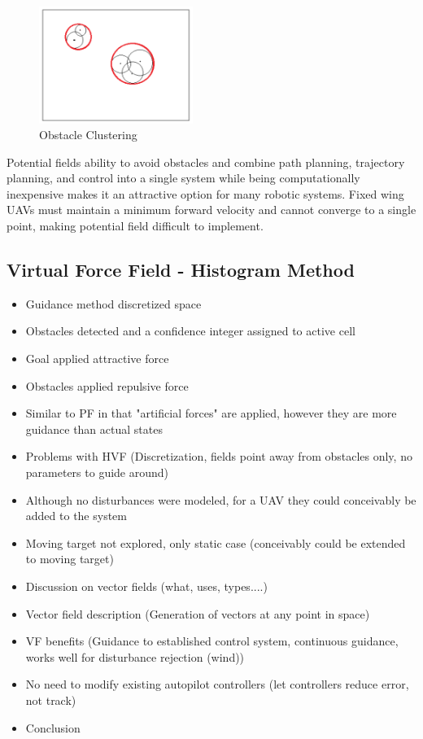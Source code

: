 \documentclass[numbered,pdftex]{ohio-etd}
\begin{document}
\begin{figure}[H]
	\centering
	\includegraphics[width=5cm]{PaperFigures/obstacleClustering}
	\caption{Obstacle Clustering \cite{liu_virtual-waypoint_2016}}
	\label{fig:obstacleclustering}
\end{figure}

Potential fields ability to avoid obstacles and combine path planning, trajectory planning, and control into a single system while being computationally inexpensive makes it an attractive option for many robotic systems. Fixed wing UAVs must maintain a minimum forward velocity and cannot converge to a single point, making potential field difficult to implement. 


\subsection{Virtual Force Field - Histogram Method}
\begin{itemize}
	\item Guidance method discretized space
	\item Obstacles detected and a confidence integer assigned to active cell
	\item Goal applied attractive force
	\item Obstacles applied repulsive force
	\item Similar to PF in that "artificial forces" are applied, however they are more guidance than actual states
	\item Problems with HVF (Discretization, fields point away from obstacles only, no parameters to guide around)
	\item Although no disturbances were modeled, for a UAV they could conceivably be added to the system
	\item Moving target not explored, only static case (conceivably could be extended to moving target)
\end{itemize}

	
\begin{itemize}
	\item Discussion on vector fields (what, uses, types....)
	\item Vector field description (Generation of vectors at any point in space)
	\item VF benefits (Guidance to established control system, continuous guidance, works well for disturbance rejection (wind))
	\item No need to modify existing autopilot controllers (let controllers reduce error, not track)
	\item Conclusion 
\end{itemize}
\end{document}
